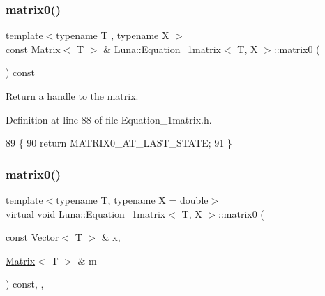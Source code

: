 \subsubsection{\texorpdfstring{matrix0()}{matrix0()}\hspace{0.1cm}{\footnotesize\ttfamily [1/2]}}
{\footnotesize\ttfamily template$<$typename T , typename X $>$ \\
const \hyperlink{classLuna_1_1Matrix}{Matrix}$<$ T $>$ \& \hyperlink{classLuna_1_1Equation__1matrix}{Luna\+::\+Equation\+\_\+1matrix}$<$ T, X $>$\+::matrix0 (\begin{DoxyParamCaption}{ }\end{DoxyParamCaption}) const\hspace{0.3cm}{\ttfamily [inline]}}



Return a handle to the matrix. 



Definition at line 88 of file Equation\+\_\+1matrix.\+h.


\begin{DoxyCode}
89  \{
90    \textcolor{keywordflow}{return} MATRIX0\_AT\_LAST\_STATE;
91  \}
\end{DoxyCode}
\mbox{\label{classLuna_1_1Equation__1matrix_a2501535a6e92abc491bc491b3f64dc06}} 
\subsubsection{\texorpdfstring{matrix0()}{matrix0()}\hspace{0.1cm}{\footnotesize\ttfamily [2/2]}}
{\footnotesize\ttfamily template$<$typename T, typename X = double$>$ \\
virtual void \hyperlink{classLuna_1_1Equation__1matrix}{Luna\+::\+Equation\+\_\+1matrix}$<$ T, X $>$\+::matrix0 (\begin{DoxyParamCaption}\item[{const \hyperlink{classLuna_1_1Vector}{Vector}$<$ T $>$ \&}]{x,  }\item[{\hyperlink{classLuna_1_1Matrix}{Matrix}$<$ T $>$ \&}]{m }\end{DoxyParamCaption}) const\hspace{0.3cm}{\ttfamily [inline]}, {\ttfamily [protected]}, {\ttfamily [virtual]}}



